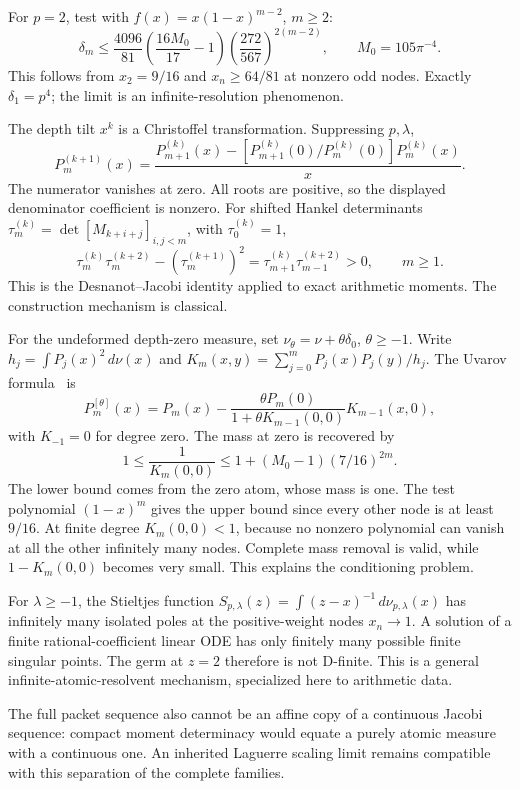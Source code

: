 \documentclass[11pt,oneside,openany]{book}
\newcommand{\dd}{\,d}
\begin{document}
For $p=2$, test with $f(x)=x(1-x)^{m-2}$, $m\ge2$:
\[
\delta_m\le\frac{4096}{81}\left(\frac{16M_0}{17}-1\right)
\left(\frac{272}{567}\right)^{2(m-2)},\qquad M_0=105\pi^{-4}.
\]
This follows from $x_2=9/16$ and $x_n\ge64/81$ at nonzero odd nodes.
Exactly $\delta_1=p^4$; the limit is an infinite-resolution phenomenon.

The depth tilt $x^k$ is a Christoffel transformation. Suppressing $p,\lambda$,
\[
P_m^{(k+1)}(x)=\frac{P_{m+1}^{(k)}(x)
-[P_{m+1}^{(k)}(0)/P_m^{(k)}(0)]P_m^{(k)}(x)}{x}.
\]
The numerator vanishes at zero. All roots are positive, so the displayed
denominator coefficient is nonzero. For shifted Hankel determinants $\tau_m^{(k)}=\det[M_{k+i+j}]_{i,j<m}$,
with $\tau_0^{(k)}=1$,
\[
\tau_m^{(k)}\tau_m^{(k+2)}-(\tau_m^{(k+1)})^2
=\tau_{m+1}^{(k)}\tau_{m-1}^{(k+2)}>0,\qquad m\ge1.
\]
This is the Desnanot--Jacobi identity applied to exact arithmetic moments.
The construction mechanism is classical.

For the undeformed depth-zero measure, set $\nu_\theta=\nu+\theta\delta_0$,
$\theta\ge-1$. Write $h_j=\int P_j(x)^2\dd\nu(x)$ and
$K_m(x,y)=\sum_{j=0}^{m}P_j(x)P_j(y)/h_j$.
The Uvarov formula~\cite{Uvarov1969} is
\[
P_m^{[\theta]}(x)=P_m(x)-
\frac{\theta P_m(0)}{1+\theta K_{m-1}(0,0)}K_{m-1}(x,0),
\]
with $K_{-1}=0$ for degree zero. The mass at zero is recovered by
\[
1\le\frac1{K_m(0,0)}\le1+(M_0-1)(7/16)^{2m}.
\]
The lower bound comes from the zero atom, whose mass is one. The test polynomial
$(1-x)^m$ gives the upper bound since every other node is at least $9/16$.
At finite degree $K_m(0,0)<1$, because no nonzero polynomial can vanish at
all the other infinitely many nodes. Complete mass removal is valid, while
$1-K_m(0,0)$ becomes very small. This explains the conditioning problem.

For $\lambda\ge-1$, the Stieltjes function $S_{p,\lambda}(z)=\int(z-x)^{-1}\dd\nu_{p,\lambda}(x)$
has infinitely many isolated poles at the positive-weight nodes $x_n\to1$.
A solution of a finite rational-coefficient linear ODE has only finitely many
possible finite singular points. The germ at $z=2$ therefore is not D-finite.
This is a general infinite-atomic-resolvent mechanism, specialized here to
arithmetic data.

The full packet sequence also cannot be an affine copy of a continuous Jacobi
sequence: compact moment determinacy would equate a purely atomic measure with
a continuous one. An inherited Laguerre scaling limit remains compatible with
this separation of the complete families.
\end{document}

